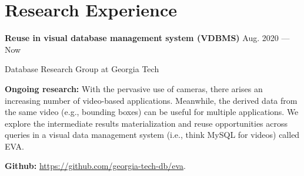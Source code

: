 \section{Research Experience}

\parbox[t][][t]{\linewidth}{
  \parbox{\linewidth}{\textbf{Reuse in visual database management system (VDBMS)}
		\hfill {{Aug. 2020 --- Now}}}
		\smallbreak
	\parbox{\linewidth}{Database Research Group at Georgia Tech}
  
	\bigskip
  \textbf{Ongoing research:} With the pervasive use of cameras, there arises an increasing number of video-based applications. Meanwhile, the derived data from the same video (e.g., bounding boxes) can be useful for multiple applications. We explore the intermediate results materialization and reuse opportunities across queries in a visual data management system (i.e., think MySQL for videos) called EVA.

  \textbf{Github:} \url{https://github.com/georgia-tech-db/eva}.
	\bigskip
}


